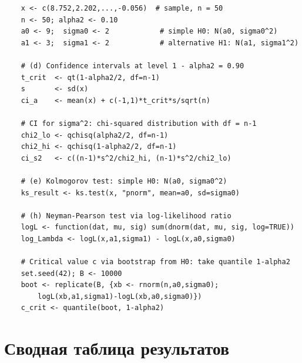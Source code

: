 \documentclass[12pt,a4paper]{article}
\begin{document}
\begin{lstlisting}
	x <- c(8.752,2.202,...,-0.056)  # sample, n = 50
	n <- 50; alpha2 <- 0.10      
	a0 <- 9;  sigma0 <- 2            # simple H0: N(a0, sigma0^2)
	a1 <- 3;  sigma1 <- 2            # alternative H1: N(a1, sigma1^2)
	
	# (d) Confidence intervals at level 1 - alpha2 = 0.90
	t_crit  <- qt(1-alpha2/2, df=n-1) 
	s       <- sd(x)
	ci_a    <- mean(x) + c(-1,1)*t_crit*s/sqrt(n)
	
	# CI for sigma^2: chi-squared distribution with df = n-1
	chi2_lo <- qchisq(alpha2/2, df=n-1)   
	chi2_hi <- qchisq(1-alpha2/2, df=n-1) 
	ci_s2   <- c((n-1)*s^2/chi2_hi, (n-1)*s^2/chi2_lo)
	
	# (e) Kolmogorov test: simple H0: N(a0, sigma0^2)
	ks_result <- ks.test(x, "pnorm", mean=a0, sd=sigma0)
	
	# (h) Neyman-Pearson test via log-likelihood ratio
	logL <- function(dat, mu, sig) sum(dnorm(dat, mu, sig, log=TRUE))
	log_Lambda <- logL(x,a1,sigma1) - logL(x,a0,sigma0)
	
	# Critical value c via bootstrap from H0: take quantile 1-alpha2
	set.seed(42); B <- 10000
	boot <- replicate(B, {xb <- rnorm(n,a0,sigma0);
		logL(xb,a1,sigma1)-logL(xb,a0,sigma0)})
	c_crit <- quantile(boot, 1-alpha2)  
\end{lstlisting}
	
	\section{Сводная таблица результатов}
	
\end{document}
